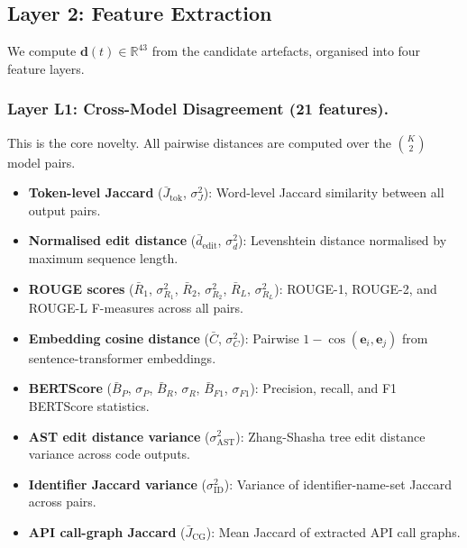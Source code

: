 \documentclass[runningheads]{llncs}
\begin{document}
\subsection{Layer 2: Feature Extraction}
\label{sec:features}

We compute $\mathbf{d}(t) \in \mathbb{R}^{43}$ from the candidate artefacts, organised into four feature layers.

\subsubsection{Layer L1: Cross-Model Disagreement (21 features).}
This is the core novelty. All pairwise distances are computed over the $\binom{K}{2}$ model pairs.

\begin{itemize}
\item \textbf{Token-level Jaccard} ($\bar{J}_\mathrm{tok}$, $\sigma^2_J$): Word-level Jaccard similarity between all output pairs.
\item \textbf{Normalised edit distance} ($\bar{d}_\mathrm{edit}$, $\sigma^2_d$): Levenshtein distance normalised by maximum sequence length.
\item \textbf{ROUGE scores} ($\bar{R}_1$, $\sigma^2_{R_1}$, $\bar{R}_2$, $\sigma^2_{R_2}$, $\bar{R}_L$, $\sigma^2_{R_L}$): ROUGE-1, ROUGE-2, and ROUGE-L F-measures across all pairs.
\item \textbf{Embedding cosine distance} ($\bar{C}$, $\sigma^2_C$): Pairwise $1 - \cos(\mathbf{e}_i, \mathbf{e}_j)$ from sentence-transformer embeddings.
\item \textbf{BERTScore} ($\bar{B}_P$, $\sigma_P$, $\bar{B}_R$, $\sigma_R$, $\bar{B}_{F1}$, $\sigma_{F1}$): Precision, recall, and F1 BERTScore statistics.
\item \textbf{AST edit distance variance} ($\sigma^2_\mathrm{AST}$): Zhang-Shasha tree edit distance variance across code outputs.
\item \textbf{Identifier Jaccard variance} ($\sigma^2_\mathrm{ID}$): Variance of identifier-name-set Jaccard across pairs.
\item \textbf{API call-graph Jaccard} ($\bar{J}_\mathrm{CG}$): Mean Jaccard of extracted API call graphs.
\end{itemize}
\end{document}
